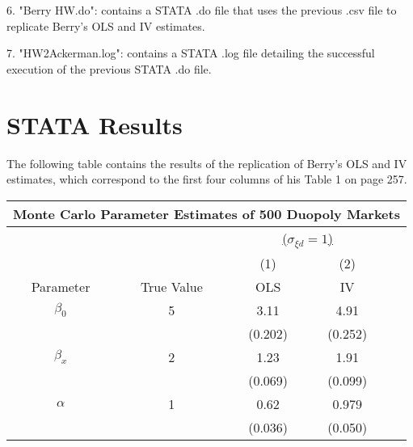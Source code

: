\documentclass[11pt]{article}
\theoremstyle{definition}
\begin{document}
\vspace{2mm}
6. "Berry HW.do": contains a STATA .do file that uses the previous .csv file to replicate Berry's OLS and IV estimates.

\vspace{2mm}
7. "HW2\textunderscore Ackerman.log": contains a STATA .log file detailing the successful execution of the previous STATA .do file.


\section*{STATA Results}
\indent 
\par
The following table contains the results of the replication of Berry's OLS and IV estimates, which correspond to the first four columns of his Table 1 on page 257.

\vspace{2.5mm}
\noindent
\begin{center}
\begin{tabular}{c c c c c}
\hline\hline
\multicolumn{5}{c}{\textbf{Monte Carlo Parameter Estimates of 500 Duopoly Markets}} \\
\hline\hline 
 &  & \multicolumn{2}{c}{\underline{($\sigma_{\xi d}=1$)}} \\
 & & (1) & (2) \\
Parameter & True Value & OLS & IV \\ 
\hline
$\beta_0$ & 5 & 3.11 & 4.91  \\
 & & (0.202) & (0.252) \\
$\beta_x$ & 2 & 1.23 & 1.91 \\ 
 & & (0.069) & (0.099)  \\
$\alpha$ & 1 & 0.62 & 0.979 \\
 & & (0.036) & (0.050) \\
\hline\hline
\end{tabular} 
\end{center} 
\end{document}

